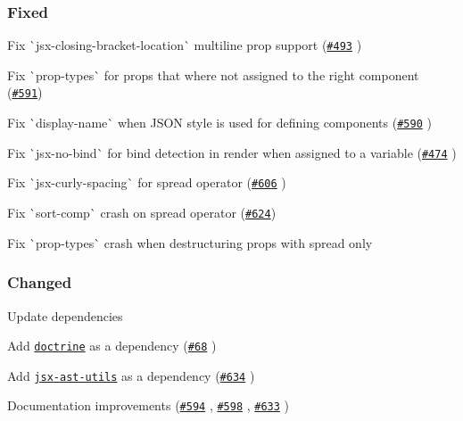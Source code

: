 \subsubsection*{Fixed}


\begin{DoxyItemize}
\item Fix \`{}jsx-\/closing-\/bracket-\/location\`{} multiline prop support (\href{https://github.com/yannickcr/eslint-plugin-react/pull/493}{\tt \#493} )
\item Fix \`{}prop-\/types\`{} for props that where not assigned to the right component (\href{https://github.com/yannickcr/eslint-plugin-react/issues/591}{\tt \#591})
\item Fix \`{}display-\/name\`{} when J\+S\+ON style is used for defining components (\href{https://github.com/yannickcr/eslint-plugin-react/issues/590}{\tt \#590} )
\item Fix \`{}jsx-\/no-\/bind\`{} for bind detection in render when assigned to a variable (\href{https://github.com/yannickcr/eslint-plugin-react/issues/474}{\tt \#474} )
\item Fix \`{}jsx-\/curly-\/spacing\`{} for spread operator (\href{https://github.com/yannickcr/eslint-plugin-react/issues/606}{\tt \#606} )
\item Fix \`{}sort-\/comp\`{} crash on spread operator (\href{https://github.com/yannickcr/eslint-plugin-react/issues/624}{\tt \#624})
\item Fix \`{}prop-\/types\`{} crash when destructuring props with spread only
\end{DoxyItemize}

\subsubsection*{Changed}


\begin{DoxyItemize}
\item Update dependencies
\item Add \href{https://github.com/eslint/doctrine}{\tt doctrine} as a dependency (\href{https://github.com/yannickcr/eslint-plugin-react/issues/68}{\tt \#68} )
\item Add \href{https://github.com/evcohen/jsx-ast-utils}{\tt jsx-\/ast-\/utils} as a dependency (\href{https://github.com/yannickcr/eslint-plugin-react/pull/634}{\tt \#634} )
\item Documentation improvements (\href{https://github.com/yannickcr/eslint-plugin-react/pull/594}{\tt \#594} , \href{https://github.com/yannickcr/eslint-plugin-react/pull/598}{\tt \#598} , \href{https://github.com/yannickcr/eslint-plugin-react/pull/633}{\tt \#633} )
\end{DoxyItemize}

